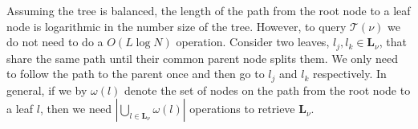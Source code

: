 Assuming the tree is balanced,
the length of the path from the root node to a leaf node is logarithmic in the
number size of the tree. However, to query $\mathcal{T}(\nu)$ we do not need to do a
$O(L \log N)$ operation. Consider two leaves, $l_{j}, l_{k} \in
\mathbf{L}_{\nu}$, that share the same path until their common parent node
splits them. We only need to follow the path to the parent once and then go to
$l_{j}$ and $l_{k}$ respectively. In general, if we by $\omega(l)$ denote the
set of nodes on the path from the root node to a leaf $l$, then we need
$|\bigcup_{l \in \mathbf{L}_{\nu}} \omega(l)|$ operations to retrieve
$\mathbf{L}_{\nu}$.






